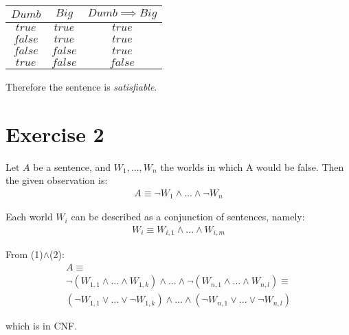 \begin{center}
\begin{tabular}{| c | c | c |}
\hline
$Dumb$ & $Big$ & $Dumb \implies Big$ \\
\hline
$true$ & $true$ & $true$ \\
\hline
$false$ & $true$ & $true$ \\
\hline
$false$ & $false$ & $true$ \\
\hline
$true$ & $false$ & $false$ \\
\hline
\end{tabular}
\end{center}

Therefore the sentence is \textit{satisfiable}.

\section*{Exercise 2}

Let $A$ be a sentence, and $W_1,...,W_n$ the worlds in which A would be false. Then the given observation is:
\smallskip
\begin{gather}
A \equiv \neg W_1 \land ... \land \neg W_n
\end{gather}

Each world $W_i$ can be described as a conjunction of sentences, namely: 
\smallskip
\begin{gather}
W_i \equiv W_{i,1} \land ... \land W_{i,m}
\end{gather}

From (1)$\land$(2):
\smallskip
\begin{gather*}
A \equiv \\ 
\neg (W_{1,1} \land ... \land W_{1,k}) \land ... \land \neg (W_{n,1} \land ... \land W_{n,l}) \equiv \\
(\neg W_{1,1} \lor ... \lor \neg W_{1,k}) \land ... \land (\neg W_{n,1} \lor ... \lor \neg W_{n,l})
\end{gather*}

which is in CNF.


